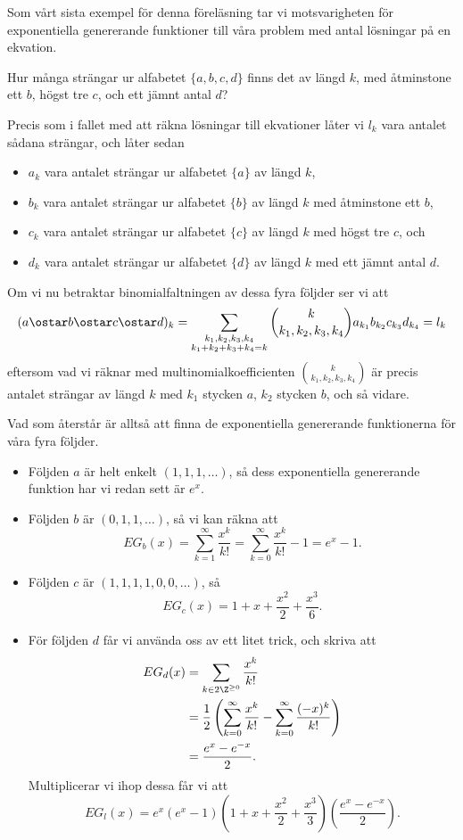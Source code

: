 \documentclass[nobib]{tufte-handout}
\begin{document}
Som vårt sista exempel för denna föreläsning tar vi motsvarigheten för exponentiella genererande funktioner till våra problem med antal lösningar på en ekvation.

\begin{example}
  Hur många strängar ur alfabetet $\{a, b, c, d\}$ finns det av längd $k$, med åtminstone ett $b$, högst tre $c$, och ett jämnt antal $d$?

  Precis som i fallet med att räkna lösningar till ekvationer låter vi $l_k$ vara antalet sådana strängar, och låter sedan
  \begin{itemize}
    \item $a_k$ vara antalet strängar ur alfabetet $\{a\}$ av längd $k$,
    \item $b_k$ vara antalet strängar ur alfabetet $\{b\}$ av längd $k$ med åtminstone ett $b$,
    \item $c_k$ vara antalet strängar ur alfabetet $\{c\}$ av längd $k$ med högst tre $c$, och
    \item $d_k$ vara antalet strängar ur alfabetet $\{d\}$ av längd $k$ med ett jämnt antal $d$.
  \end{itemize}

  Om vi nu betraktar binomialfaltningen av dessa fyra följder ser vi att
  $$(a \ostar b \ostar c \ostar d)_k = \sum_{\substack{k_1, k_2, k_3, k_4\\k_1 + k_2 + k_3 + k_4 = k}} \binom{k}{k_1, k_2, k_3, k_4} a_{k_1}b_{k_2}c_{k_3}d_{k_4} = l_k$$
  eftersom vad vi räknar med multinomialkoefficienten $\binom{k}{k_1, k_2, k_3, k_4}$ är precis antalet strängar av längd $k$ med $k_1$ stycken $a$, $k_2$ stycken $b$, och så vidare.

  Vad som återstår är alltså att finna de exponentiella genererande funktionerna för våra fyra följder.
  \begin{itemize}
    \item Följden $a$ är helt enkelt $(1,1,1,\ldots)$, så dess exponentiella genererande funktion har vi redan sett är $e^x$.
    \item Följden $b$ är $(0,1,1,\ldots)$, så vi kan räkna att 
    $$EG_b(x) = \sum_{k=1}^{\infty} \frac{x^k}{k!} = \sum_{k=0}^{\infty} \frac{x^k}{k!} - 1 = e^x - 1.$$
    \item Följden $c$ är $(1,1,1,1,0,0,\ldots)$, så 
    $$EG_c(x) = 1 + x + \frac{x^2}{2} + \frac{x^3}{6}.$$
    \item För följden $d$ får vi använda oss av ett litet trick, och skriva att 
    \begin{align*}
      EG_d(x) &= \sum_{k \in 2\Z^{\geq 0}} \frac{x^k}{k!}\\
      &= \frac{1}{2}\left(\sum_{k=0}^{\infty} \frac{x^k}{k!} - \sum_{k=0}^{\infty} \frac{(-x)^k}{k!}\right)\\
      &= \frac{e^x - e^{-x}}{2}.
    \end{align*}
    Multiplicerar vi ihop dessa får vi att 
    $$EG_l(x) = e^x\left(e^x - 1\right)\left(1 + x + \frac{x^2}{2} + \frac{x^3}{3}\right)\left(\frac{e^x - e^{-x}}{2}\right).$$
    

\end{itemize}
\end{example}
\end{document}
